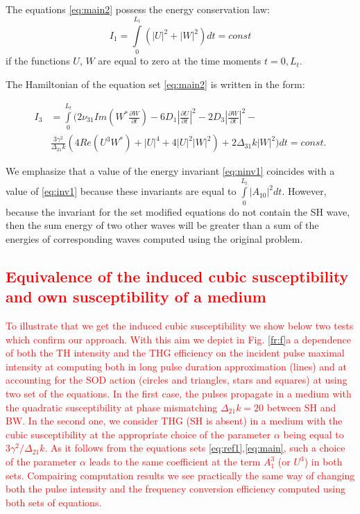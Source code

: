 \documentclass[a4paper, 12pt, onecolumn]{extarticle}
\begin{document}
The equations  \eqref{eq:main2} possess the energy conservation law: 
\begin{equation}
\label{eq:ninv1}
I_1=\int\limits_0^{L_t}\left(|U|^2+|W|^2\right)dt=const
\end{equation}
if the functions \(U,\,W\) are equal to zero at the time moments \(t=0,L_t\).  

The Hamiltonian of the equation set \eqref{eq:main2} is written in the form:

\begin{equation}
\label{eq:ninv3}
\begin{aligned}
I_3&=\int\limits_0^{L_t}\Big(2\nu_{31}Im\left(W^*\frac{\partial W}{\partial t}\right)-6D_1|\frac{\partial U}{\partial t}|^2-2D_3|\frac{\partial W}{\partial t}|^2-\\
&\frac{3\gamma^2}{\Delta_{21}k}\left(4Re(U^3W^*)+|U|^4+4|U|^2|W|^2\right)+2\Delta_{31}k|W|^2\Big)dt=const.
\end{aligned}
\end{equation}

We  emphasize that a value of the energy invariant \eqref{eq:ninv1} coincides with a value of  \eqref{eq:inv1} because these invariants are equal to \(\int\limits_0^{L_t}|A_{10}|^2dt\). However, because the invariant for the  set modified equations do not contain the SH wave, then the sum energy of two other waves will be greater than a sum of the energies of corresponding waves computed using the original problem.


\textcolor{red}
{
\subsection{Equivalence   of the induced cubic susceptibility and  own susceptibility of a medium }
}


\textcolor{red} {To illustrate that we get the induced cubic susceptibility we show below two tests which confirm our approach. With this aim we depict in Fig. \ref{fr:f}a a dependence of both the TH intensity and the THG efficiency on the incident pulse maximal intensity at computing both in long pulse duration approximation (lines) and at accounting for the   SOD action    (circles and triangles, stars and squares) at using two set of the equations. In the first case, the pulses propagate in a medium with the quadratic susceptibility at phase mismatching \(\Delta_{21}k=20\) between SH and BW. In the second one, we consider THG (SH is absent) in a medium with the cubic susceptibility at the appropriate choice of the parameter \(\alpha\) being equal to \(3\gamma^2/\Delta_{21}k\). As it follows from the equations sets \eqref{eq:ref1},\eqref{eq:main}, such a choice of the parameter \(\alpha\) leads to the same coefficient at the term $A_1^3$ (or $U^3$) in both sets. Compairing computation results we see practically the same way of changing both the pulse intensity and the frequency conversion efficiency computed using both sets of equations.} 
\end{document}
